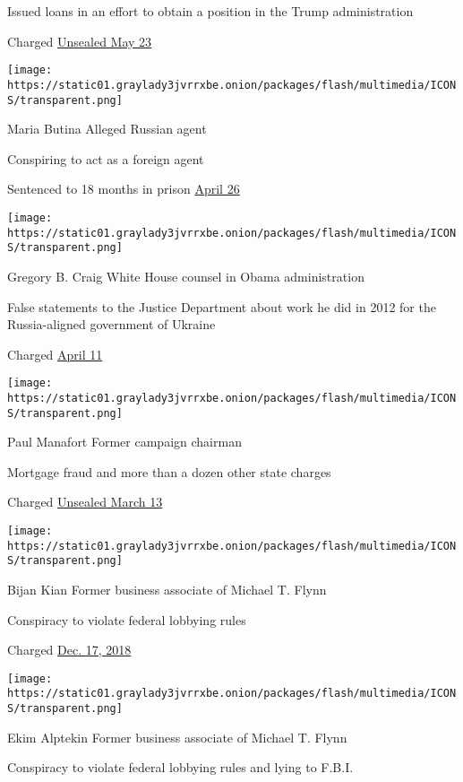 Issued loans in an effort to obtain a position in the Trump
administration

Charged
\href{https://www.nytimes3xbfgragh.onion/2019/05/23/nyregion/stephen-calk-manafort-arrest.html}{Unsealed
May 23}

\texttt{[image: https://static01.graylady3jvrrxbe.onion/packages/flash/multimedia/ICONS/transparent.png]}

Maria Butina Alleged Russian agent

Conspiring to act as a foreign agent

Sentenced to 18 months in prison
\href{https://www.nytimes3xbfgragh.onion/2019/04/26/us/politics/maria-butina-sentence-russia.html}{April
26}

\texttt{[image: https://static01.graylady3jvrrxbe.onion/packages/flash/multimedia/ICONS/transparent.png]}

Gregory B. Craig White House counsel in Obama administration

False statements to the Justice Department about work he did in 2012 for
the Russia-aligned government of Ukraine

Charged
\href{https://www.nytimes3xbfgragh.onion/2019/04/11/us/politics/gregory-craig-indictment.html}{April
11}

\texttt{[image: https://static01.graylady3jvrrxbe.onion/packages/flash/multimedia/ICONS/transparent.png]}

Paul Manafort Former campaign chairman

Mortgage fraud and more than a dozen other state charges

Charged
\href{https://www.nytimes3xbfgragh.onion/2019/03/13/nyregion/manafort-indictment.html?action=click\&module=Top\%20Stories\&pgtype=Homepage}{Unsealed
March 13}

\texttt{[image: https://static01.graylady3jvrrxbe.onion/packages/flash/multimedia/ICONS/transparent.png]}

Bijan Kian Former business associate of Michael T. Flynn

Conspiracy to violate federal lobbying rules

Charged
\href{https://www.nytimes3xbfgragh.onion/2018/12/17/us/politics/flynn-turkey-bijan-kian.html}{Dec.
17, 2018}

\texttt{[image: https://static01.graylady3jvrrxbe.onion/packages/flash/multimedia/ICONS/transparent.png]}

Ekim Alptekin Former business associate of Michael T. Flynn

Conspiracy to violate federal lobbying rules and lying to F.B.I.

